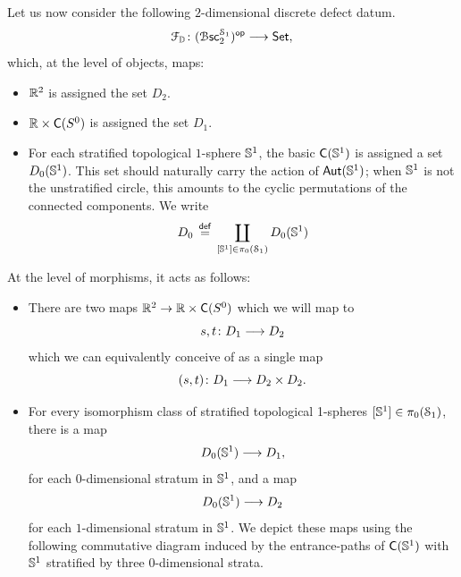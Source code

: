 \begin{example}
    Let us now consider the following $2$-dimensional discrete defect datum.
    \begin{equation}
        \mathcal F_{\mathbb D} \colon (\operatorname{\mathcal B\mathsf{sc}}_{2}^{\mathcal S_1})^{\mathsf{op}} \longrightarrow \operatorname{{\mathsf{Set}}},
    \end{equation}
    which, at the level of objects, maps:
    \begin{itemize}
        \item $\mathbb R^{2}$ is assigned the set $D_2$.
        \item $\mathbb R\times \mathsf C(S^0)$ is assigned the set $D_1$.
        \item For each stratified topological $1$-sphere $\mathbb S^1$, the basic $\mathsf C(\mathbb S^1)$ is assigned a set $D_0(\mathbb S^1)$. This set should naturally carry the action of $\operatorname{\sf Aut}(\mathbb S^1)$; when $\mathbb S^1$ is not the unstratified circle, this amounts to the cyclic permutations of the connected components. We write
        \begin{equation}
            D_0 \, \overset{\sf def}{=} \, \coprod_{[\mathbb S^1]\in \pi_0(\mathcal S_1)} D_0(\mathbb S^1) 
        \end{equation}
    \end{itemize}
    At the level of morphisms, it acts as follows:
    \begin{itemize}
        \item There are two maps $\mathbb R^2 \rightarrow \mathbb R\times \mathsf C(S^0)$ which we will map to 
        \begin{equation}
            s,t \colon D_1 \longrightarrow D_2
        \end{equation}
        which we can equivalently conceive of as a single map 
        \begin{equation}
            (s,t) \colon D_1 \longrightarrow D_2 \times D_2.
        \end{equation} 
        \item For every isomorphism class of stratified topological 1-spheres $[\mathbb S^1]\in \pi_0(\mathcal S_1)$, there is a map 
        \begin{equation}
            D_0(\mathbb S^1) \longrightarrow D_1,
        \end{equation} 
        for each $0$-dimensional stratum in $\mathbb S^1$, and a map 
        \begin{equation}
            D_0(\mathbb S^1) \longrightarrow D_2
        \end{equation}
        for each $1$-dimensional stratum in $\mathbb S^1$. We depict these maps using the following commutative diagram induced by the entrance-paths of $\mathsf C(\mathbb S^1)$ with $\mathbb S^1$ stratified by three $0$-dimensional strata.

\end{itemize}
\end{example}

